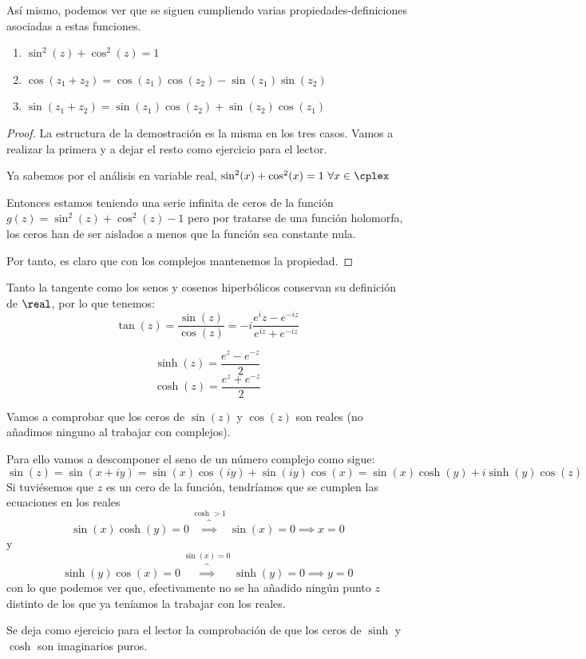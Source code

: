 \documentclass{apuntes}
\begin{document}
Así mismo, podemos ver que se siguen cumpliendo varias propiedades-definiciones asociadas a estas funciones.
\begin{enumerate}
\item $\sin^2(z)+\cos^2(z) =1$
\item $\cos(z_1+z_2)=\cos(z_1)\cos(z_2)-\sin(z_1)\sin(z_2)$
\item $\sin(z_1+z_2)=\sin(z_1)\cos(z_2)+\sin(z_2)\cos(z_1)$
\end{enumerate}
\begin{proof}
La estructura de la demostración es la misma en los tres casos. Vamos a realizar la primera y a dejar el resto como ejercicio para el lector.

Ya sabemos por el análisis en variable real, $\sin^2(x)+\cos^2(x)=1 \ \forall x \in \cplex$

Entonces estamos teniendo una serie infinita de ceros de la función
$g(z)=\sin^2(z)+\cos^2(z)-1$
pero por tratarse de una función holomorfa, los ceros han de ser aislados a menos que la función sea constante nula.

Por tanto, es claro que con los complejos mantenemos la propiedad.
\end{proof}

Tanto la tangente como los senos y cosenos hiperbólicos conservan su definición de $\real$, por lo que tenemos:
\[\tan(z)=\frac{\sin(z)}{\cos(z)}=-i \frac{e^iz-e^{-iz}}{e^{iz}+e^{-iz}}\]

\[\sinh(z)=\frac{e^z-e^{-z}}{2}\]
\[\cosh(z)=\frac{e^z+e^{-z}}{2}\]

\begin{example}
Vamos a comprobar que los ceros de $\sin(z)$ y $\cos(z)$ son reales (no añadimos ninguno al trabajar con complejos).

Para ello vamos a descomponer el seno de un número complejo como sigue:
\[\sin(z)=\sin(x+iy)=\sin(x)\cos(iy)+\sin(iy)\cos(x)=\sin(x)\cosh(y)+i\sinh(y)\cos(z)\]
Si tuviésemos que $z$ es un cero de la función, tendríamos que se cumplen las ecuaciones en los reales
\[\sin(x)\cosh(y)=0 \overbrace{\implies}^{\cosh > 1} \sin(x)=0 \implies x = 0\]
y
\[\sinh(y)\cos(x)=0 \overbrace{\implies}^{\sin(x)=0} \sinh(y)=0 \implies y=0\]
con lo que podemos ver que, efectivamente no se ha añadido ningún punto $z$ distinto de los que ya teníamos la trabajar con los reales.
\end{example}

Se deja como ejercicio para el lector la comprobación de que los ceros de $\sinh$ y $\cosh$ son imaginarios puros.
\end{document}
